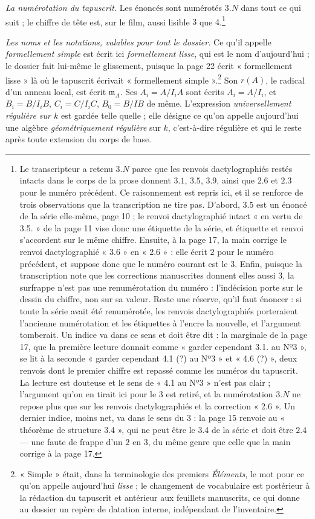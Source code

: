 \documentclass[11pt,a4paper]{article}
\begin{document}
\emph{La numérotation du tapuscrit.} Les énoncés sont numérotés $3.N$ dans tout
ce qui suit ; le chiffre de tête est, sur le film, aussi lisible $3$ que
$4$.\footnote{Le transcripteur a retenu $3.N$ parce que les renvois
dactylographiés restés intacts dans le corps de la prose donnent $3.1$, $3.5$,
$3.9$, ainsi que $2.6$ et $2.3$ pour le numéro précédent. Ce raisonnement est
repris ici, et il se renforce de trois observations que la transcription ne
tire pas. D'abord, $3.5$ est un énoncé de la série elle-même, page 10 ; le
renvoi dactylographié intact « en vertu de 3.5. » de la page 11 vise donc une
étiquette de la série, et étiquette et renvoi s'accordent sur le même chiffre.
Ensuite, à la page 17, la main corrige le renvoi dactylographié « 3.6 » en
« 2.6 » : elle écrit $2$ pour le numéro précédent, et suppose donc que le
numéro courant est le $3$. Enfin, puisque la transcription note que les
corrections manuscrites donnent elles aussi $3$, la surfrappe n'est pas une
renumérotation du numéro : l'indécision porte sur le dessin du chiffre, non sur
sa valeur. Reste une réserve, qu'il faut énoncer : si toute la série avait été
renumérotée, les renvois dactylographiés porteraient l'ancienne numérotation et
les étiquettes à l'encre la nouvelle, et l'argument tomberait. Un indice va
dans ce sens et doit être dit : la marginale de la page 17, que la première
lecture donnait comme « garder cependant 3.1. au Nº3 », se lit à la seconde
« garder cependant 4.1 (?) au Nº3 » et « 4.6 (?) », deux renvois dont le
premier chiffre est repassé comme les numéros du tapuscrit. La lecture est
douteuse et le sens de « 4.1 au Nº3 » n'est pas clair ; l'argument qu'on en
tirait ici pour le $3$ est retiré, et la numérotation $3.N$ ne repose plus que
sur les renvois dactylographiés et la correction « 2.6 ». Un dernier indice,
moins net, va dans le sens du $3$ : la page 15 renvoie au « théorème de
structure 3.4 », qui ne peut être le 3.4 de la série et doit être $2.4$ — une
faute de frappe d'un $2$ en $3$, du même genre que celle que la main corrige à
la page 17.}

\emph{Les noms et les notations, valables pour tout le dossier.} Ce qu'il
appelle \emph{formellement simple} est écrit ici \emph{formellement lisse},
qui est le nom d'aujourd'hui ; le dossier fait lui-même le glissement, puisque
la page 22 écrit « formellement lisse » là où le tapuscrit écrivait
« formellement simple ».\footnote{« Simple » était, dans la terminologie des
premiers \emph{Éléments}, le mot pour ce qu'on appelle aujourd'hui
\emph{lisse} ; le changement de vocabulaire est postérieur à la rédaction du
tapuscrit et antérieur aux feuillets manuscrits, ce qui donne au dossier un
repère de datation interne, indépendant de l'inventaire.} Son $r(A)$, le radical
d'un anneau local, est écrit $\mathfrak{m}_A$. Ses $A_i = A/I_iA$ sont écrits
$A_i = A/I_i$, et $B_i = B/I_iB$, $C_i = C/I_iC$, $B_0 = B/IB$ de même.
L'expression \emph{universellement régulière sur $k$} est gardée telle quelle ;
elle désigne ce qu'on appelle aujourd'hui une algèbre \emph{géométriquement
régulière} sur $k$, c'est-à-dire régulière et qui le reste après toute
extension du corps de base.
\end{document}
